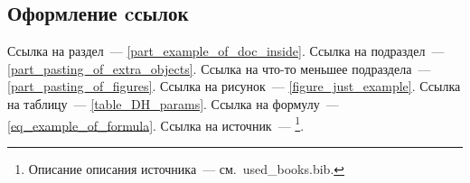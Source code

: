 \subsection{Оформление cсылок}\label{part_editing_of_refs}
Ссылка на раздел~--- \ref{part_example_of_doc_inside}.
Ссылка на подраздел~--- \ref{part_pasting_of_extra_objects}.
Ссылка на что-то меньшее подраздела~--- \ref{part_pasting_of_figures}.
Ссылка на рисунок~--- \ref{figure_just_example}.
Ссылка на таблицу~--- \ref{table_DH_params}.
Ссылка на формулу~--- \eqref{eq_example_of_formula}.
Ссылка на источник~--- \cite{UrcolaIROS08}\footnote{Описание описания источника~--- см.~used\_books.bib.}.
\newpage